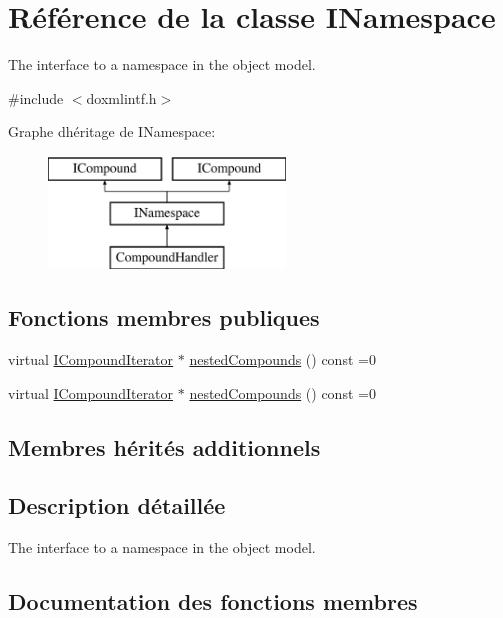 \hypertarget{class_i_namespace}{}\section{Référence de la classe I\+Namespace}
\label{class_i_namespace}


The interface to a namespace in the object model.  




{\ttfamily \#include $<$doxmlintf.\+h$>$}

Graphe d\textquotesingle{}héritage de I\+Namespace\+:\begin{figure}[H]
\begin{center}
\leavevmode
\includegraphics[height=3.000000cm]{class_i_namespace}
\end{center}
\end{figure}
\subsection*{Fonctions membres publiques}
\begin{DoxyCompactItemize}
\item 
virtual \hyperlink{class_i_compound_iterator}{I\+Compound\+Iterator} $\ast$ \hyperlink{class_i_namespace_a33ad308f4ed6acaaccfa4ff572d1a86a}{nested\+Compounds} () const  =0
\item 
virtual \hyperlink{class_i_compound_iterator}{I\+Compound\+Iterator} $\ast$ \hyperlink{class_i_namespace_a33ad308f4ed6acaaccfa4ff572d1a86a}{nested\+Compounds} () const  =0
\end{DoxyCompactItemize}
\subsection*{Membres hérités additionnels}


\subsection{Description détaillée}
The interface to a namespace in the object model. 

\subsection{Documentation des fonctions membres}
\hypertarget{class_i_namespace_a33ad308f4ed6acaaccfa4ff572d1a86a}{}
